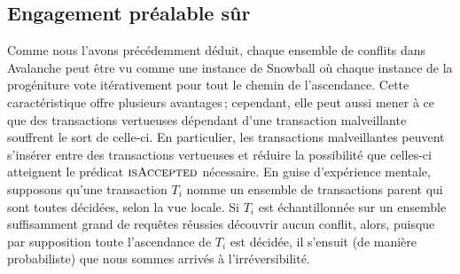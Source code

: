 \documentclass[letterpaper,twocolumn,10pt]{article}
\theoremstyle{definition}
\begin{document}
\begin{appendices}
\subsection{Engagement préalable sûr}
Comme nous l'avons précédemment déduit, chaque ensemble de conflits dans Avalanche peut être vu comme une instance de Snowball où chaque instance de la progéniture vote itérativement pour tout le chemin de l'ascendance. 
Cette caractéristique offre plusieurs avantages\,; cependant, elle peut aussi mener à ce que des transactions vertueuses dépendant d'une transaction malveillante souffrent le sort de celle-ci.
En particulier, les transactions malveillantes peuvent s'insérer entre des transactions vertueuses et réduire la possibilité que celles-ci atteignent le prédicat $\textsc{isAccepted}$ nécessaire.
En guise d'expérience mentale, supposons qu'une transaction $T_i$ nomme un ensemble de transactions parent qui sont toutes décidées, selon la vue locale.
Si $T_i$ est échantillonnée sur un ensemble suffisamment grand de requêtes réussies découvrir aucun conflit, alors, puisque par supposition toute l'ascendance de $T_i$ est décidée, il s'ensuit (de manière probabiliste) que nous sommes arrivés à l'irréversibilité.


\end{appendices}
\end{document}

